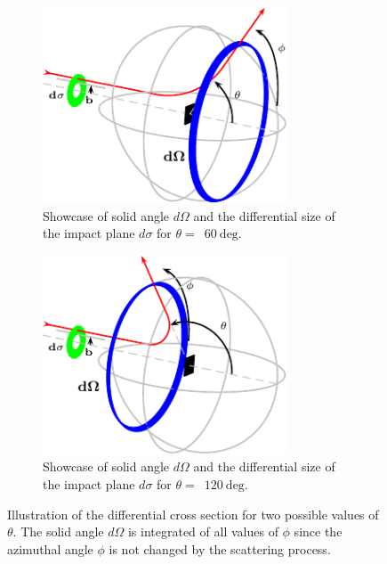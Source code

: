 \documentclass[a4paper,12pt,titlepage, twoside]{article}
\newcommand{\unit}[2]{$#1~\ensuremath{\mathrm{#2}}$}
\begin{document}
\begin{figure}[ht]
  \centering
  \begin{subfigure}{0.49\textwidth}
    \centering
    \includegraphics[width=0.8\textwidth]{./fig/compton_scattering_illustration_1.pdf}
    \caption{Showcase of solid angle $d\Omega$ and the differential size of the impact plane $d\sigma$ for $\theta=$~\unit{60}{deg}.}
    \label{fig:differential_cross_section_1}
  \end{subfigure}
  \begin{subfigure}{0.49\textwidth}
    \centering
    \includegraphics[width=0.8\textwidth]{./fig/compton_scattering_illustration_2.pdf}
    \caption{Showcase of solid angle $d\Omega$ and the differential size of the impact plane $d\sigma$ for $\theta=$~\unit{120}{deg}.}
    \label{fig:differential_cross_section_2}
  \end{subfigure}
  \caption{Illustration of the differential cross section for two possible values of $\theta$. The solid angle $d\Omega$ is integrated of all values of $\phi$ since the azimuthal angle $\phi$ is not changed by the scattering process.}
  \label{fig:differential_cross_section}
\end{figure}
\end{document}
